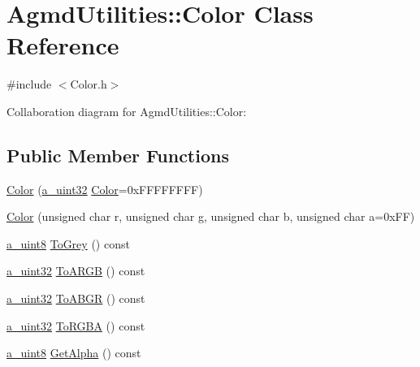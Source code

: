 \hypertarget{class_agmd_utilities_1_1_color}{\section{Agmd\+Utilities\+:\+:Color Class Reference}
\label{class_agmd_utilities_1_1_color}
}


{\ttfamily \#include $<$Color.\+h$>$}



Collaboration diagram for Agmd\+Utilities\+:\+:Color\+:
\subsection*{Public Member Functions}
\begin{DoxyCompactItemize}
\item 
\hyperlink{class_agmd_utilities_1_1_color_add76e123dda461c86f02273c5dbc0ad7}{Color} (\hyperlink{_common_defines_8h_a964296f9770051b9e4807b1f180dd416}{a\+\_\+uint32} \hyperlink{class_agmd_utilities_1_1_color}{Color}=0x\+F\+F\+F\+F\+F\+F\+F\+F)
\item 
\hyperlink{class_agmd_utilities_1_1_color_a2d7867c30d3bd8e7b1e246abfa5910eb}{Color} (unsigned char r, unsigned char \hyperlink{_examples_2_planet_2_app_8cpp_a8cf17d727651616de6f2b79ef32170cd}{g}, unsigned char b, unsigned char a=0x\+F\+F)
\item 
\hyperlink{_common_defines_8h_afbe6c09973474a1f78f870f39073398f}{a\+\_\+uint8} \hyperlink{class_agmd_utilities_1_1_color_a06ab5ab8505f846d62cb141a644dd6b4}{To\+Grey} () const 
\item 
\hyperlink{_common_defines_8h_a964296f9770051b9e4807b1f180dd416}{a\+\_\+uint32} \hyperlink{class_agmd_utilities_1_1_color_a1b1cfdcb5107075b172606e37a469612}{To\+A\+R\+G\+B} () const 
\item 
\hyperlink{_common_defines_8h_a964296f9770051b9e4807b1f180dd416}{a\+\_\+uint32} \hyperlink{class_agmd_utilities_1_1_color_a381deccd825bfb74ca4c99990b95ae7a}{To\+A\+B\+G\+R} () const 
\item 
\hyperlink{_common_defines_8h_a964296f9770051b9e4807b1f180dd416}{a\+\_\+uint32} \hyperlink{class_agmd_utilities_1_1_color_ad7639e01720cacacc7c99553f62f68da}{To\+R\+G\+B\+A} () const 
\item 
\hyperlink{_common_defines_8h_afbe6c09973474a1f78f870f39073398f}{a\+\_\+uint8} \hyperlink{class_agmd_utilities_1_1_color_a12c54bc6449d19f7ab6d2a247587c3df}{Get\+Alpha} () const 
\item 

\end{DoxyCompactItemize}
